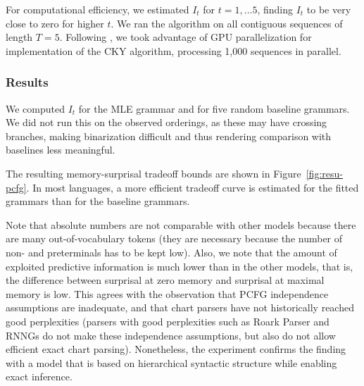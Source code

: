 \documentclass[11pt,letterpaper]{article}
\begin{document}
For computational efficiency, we estimated $I_t$ for $t=1, \dots 5$, finding $I_t$ to be very close to zero for higher $t$.
We ran the algorithm on all contiguous sequences of length $T=5$.
Following \cite{DBLP:conf/acl/KimDR19}, we took advantage of GPU parallelization for implementation of the CKY algorithm, processing 1,000 sequences in parallel.


\subsubsection{Results}
We computed $I_t$ for the MLE grammar and for five random baseline grammars.
We did not run this on the observed orderings, as these may have crossing branches, making binarization difficult and thus rendering comparison with baselines less meaningful.

The resulting memory-surprisal tradeoff bounds are shown in Figure~\ref{fig:resu-pcfg}.
In most languages, a more efficient tradeoff curve is estimated for the fitted grammars than for the baseline grammars.

Note that absolute numbers are not comparable with other models because there are many out-of-vocabulary tokens (they are necessary because the number of non- and preterminals has to be kept low).
Also, we note that the amount of exploited predictive information is much lower than in the other models, that is, the difference between surprisal at zero memory and surprisal at maximal memory is low.
This agrees with the observation that PCFG independence assumptions are inadequate, and that chart parsers have not historically reached good perplexities (parsers with good perplexities such as Roark Parser and RNNGs do not make these independence assumptions, but also do not allow efficient exact chart parsing).
Nonetheless, the experiment confirms the finding with a model that is based on hierarchical syntactic structure while enabling exact inference.
\end{document}
